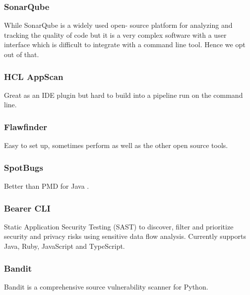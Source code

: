 \documentclass[conference]{IEEEtran}
\begin{document}
\subsubsection{SonarQube}
While SonarQube is a widely used open- source platform for analyzing and tracking the quality of code \cite{8813272} but it is a very complex software with a user interface which is difficult to integrate with a command line tool. Hence we opt out of that.
\subsubsection{HCL AppScan}
Great as an IDE plugin but hard to build into a pipeline run on the command line.
\subsubsection{Flawfinder}
Easy to set up, sometimes perform as well as the other open source tools\cite{bitdefendercomparison}.
\subsubsection{SpotBugs}
Better than PMD for Java \cite{KAUR20202023}.
\subsubsection{Bearer CLI}
Static Application Security Testing (SAST) to discover, filter and prioritize security and privacy risks using sensitive data flow analysis. Currently supports Java, Ruby, JavaScript and TypeScript.
\subsubsection{Bandit}
Bandit is a comprehensive source vulnerability scanner for Python.
\end{document}
